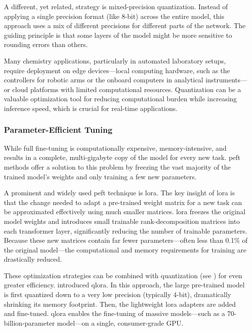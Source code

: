 A different, yet related, strategy is mixed-precision quantization.\autocite{micikevicius2017mixed} Instead of applying a single precision format (like 8-bit) across the entire model, this approach uses a mix of different precisions for different parts of the network. The guiding principle is that some layers of the model might be more sensitive to rounding errors than others.


Many chemistry applications, particularly in automated laboratory setups, require deployment on edge devices---local computing hardware, such as the controllers for robotic arms or the onboard computers in analytical instruments---or cloud platforms with limited computational resources. Quantization can be a valuable optimization tool for reducing computational burden while increasing inference speed, which is crucial for real-time applications.


\subsubsection{Parameter-Efficient Tuning}
\label{sec:peft}

While full fine-tuning is computationally expensive, memory-intensive, and results in a complete, multi-gigabyte copy of the model for every new task. 
\gls{peft} methods offer a solution to this problem by freezing the vast majority of the trained model's weights and only training a few new parameters.

A prominent and widely used \gls{peft} technique is \gls{lora}.\autocite{hu2022lora}  
The key insight of \gls{lora} is that the change needed to adapt a pre-trained weight matrix for a new task can be approximated effectively using much smaller matrices. \gls{lora} freezes the original model weights and introduces small trainable rank-decomposition matrices into each transformer layer, significantly reducing the number of trainable parameters. 
Because these new matrices contain far fewer parameters---often less than 0.1\% of the original model---the computational and memory requirements for training are drastically reduced.
 
These optimization strategies can be combined with quantization (see ) for even greater efficiency. \textcite{dettmers2023qlora} introduced \gls{qlora}. 
In this approach, the large pre-trained model is first quantized down to a very low precision (typically 4-bit), dramatically shrinking its memory footprint. 
Then, the lightweight \gls{lora} adapters are added and fine-tuned. \gls{qlora} enables the fine-tuning of massive models---such as a 70-billion-parameter model---on a single, consumer-grade GPU.


